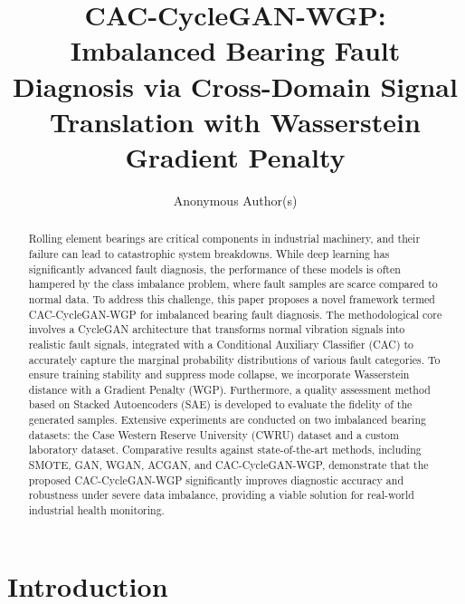 \documentclass[conference,twocolumn]{IEEEtran}
\begin{document}
\title{CAC-CycleGAN-WGP: Imbalanced Bearing Fault Diagnosis via Cross-Domain Signal Translation with Wasserstein Gradient Penalty}
\author{Anonymous Author(s)}
\maketitle

\begin{abstract}
Rolling element bearings are critical components in industrial machinery, and their failure can lead to catastrophic system breakdowns. While deep learning has significantly advanced fault diagnosis, the performance of these models is often hampered by the class imbalance problem, where fault samples are scarce compared to normal data. To address this challenge, this paper proposes a novel framework termed CAC-CycleGAN-WGP for imbalanced bearing fault diagnosis. The methodological core involves a CycleGAN architecture that transforms normal vibration signals into realistic fault signals, integrated with a Conditional Auxiliary Classifier (CAC) to accurately capture the marginal probability distributions of various fault categories. To ensure training stability and suppress mode collapse, we incorporate Wasserstein distance with a Gradient Penalty (WGP). Furthermore, a quality assessment method based on Stacked Autoencoders (SAE) is developed to evaluate the fidelity of the generated samples. Extensive experiments are conducted on two imbalanced bearing datasets: the Case Western Reserve University (CWRU) dataset and a custom laboratory dataset. Comparative results against state-of-the-art methods, including SMOTE, GAN, WGAN, ACGAN, and CAC-CycleGAN-WGP, demonstrate that the proposed CAC-CycleGAN-WGP significantly improves diagnostic accuracy and robustness under severe data imbalance, providing a viable solution for real-world industrial health monitoring.
\end{abstract}

\section{Introduction}
\label{sec:intro}
\end{document}
